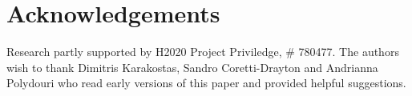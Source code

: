 \ifanonymous\else
\section{Acknowledgements}

Research partly supported by H2020 Project Priviledge, \# 780477.
The authors wish to thank Dimitris Karakostas, Sandro Coretti-Drayton and
Andrianna Polydouri who read early versions of this paper and provided helpful
suggestions.
\fi
